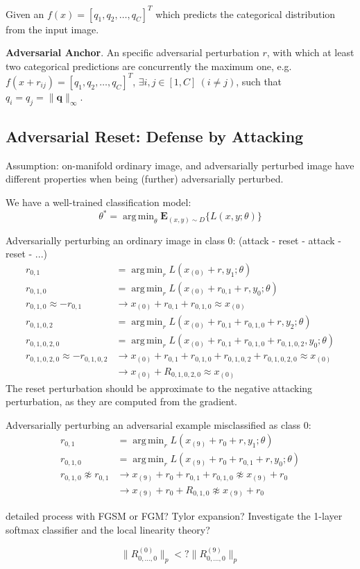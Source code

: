 \documentclass[twocolumn]{article}
\DeclareMathOperator*{\argmin}{arg\,min}
\begin{document}
Given an $f(x)=[q_1,q_2,\ldots,q_C]^T$ which predicts the categorical distribution from the input image.

\textbf{Adversarial Anchor}.
An specific adversarial perturbation $r$, with which at least two categorical predictions are concurrently the maximum one, e.g. $f(x+r_{ij})=[q_1,q_2,\ldots,q_C]^T$, $\exists i,j \in [1,C] ~(i\neq j)$, such that $q_i=q_j = \|\mathbf{q}\|_\infty$.

\subsection{Adversarial Reset: Defense by Attacking}

Assumption: on-manifold ordinary image, and adversarially perturbed image have different properties when being (further) adversarially perturbed.

We have a well-trained classification model:
\begin{equation}
\theta^* = \argmin_\theta \mathbf{E}_{(x,y)\sim D} \big\{ L(x,y;\theta) \big\}
\end{equation}

Adversarially perturbing an ordinary image in class $0$: (attack - reset - attack - reset - ...)
\begin{align}
r_{0,1} &= \argmin_r L(x_{(0)} + r, y_1; \theta) \\
	r_{0,1,0} &= \argmin_r L(x_{(0)} + r_{0,1} + r, y_0; \theta) \\
	r_{0,1,0} \approx - r_{0,1} &\rightarrow x_{(0)} + r_{0,1} + r_{0,1,0} \approx x_{(0)} \\
	r_{0,1,0,2} &= \argmin_r L(x_{(0)} + r_{0,1} + r_{0,1,0} + r, y_2; \theta) \\
	r_{0,1,0,2,0} &= \argmin_r L(x_{(0)} + r_{0,1} + r_{0,1,0} + r_{0,1,0,2}, y_0; \theta) \\
	r_{0,1,0,2,0} \approx - r_{0,1,0,2} &\rightarrow 		x_{(0)} + r_{0,1} + r_{0,1,0} + r_{0,1,0,2} + r_{0,1,0,2,0} \approx x_{(0)}\\
	&\rightarrow x_{(0)} + R_{0,1,0,2,0} \approx x_{(0)}
\end{align}
The reset perturbation should be approximate to the negative attacking perturbation, as they are computed from the gradient.

Adversarially perturbing an adversarial example misclassified as class $0$:
\begin{align}
	r_{0,1} &= \argmin_r L(x_{(9)} + r_0 + r, y_1; \theta)\\
	r_{0,1,0} &= \argmin_r L(x_{(9)} + r_0 + r_{0,1} + r, y_0; \theta)\\
	r_{0,1,0} \not\approx r_{0,1} &\rightarrow x_{(9)} + r_0 + r_{0,1} + r_{0,1,0} \not\approx x_{(9)}+ r_0\\ 	%
	&\rightarrow x_{(9)} + r_{0} + R_{0,1,0} \not\approx x_{(9)} + r_0
\end{align}

detailed process with FGSM or FGM? Tylor expansion? Investigate the 1-layer softmax classifier and the local linearity theory?

\begin{equation}
	\| R^{(0)}_{0,\ldots,0} \|_p <? \| R^{(9)}_{0,\ldots,0} \|_p
\end{equation}
	
\end{document}
